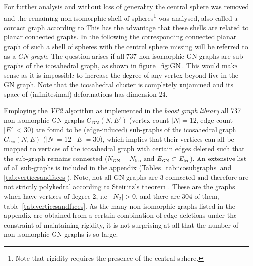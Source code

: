 For further analysis and without loss of generality the central sphere was
removed and the remaining non-isomorphic shell of spheres\footnote{Note that
rigidity requires the presence of the central sphere.} was analysed, also called
a contact graph according to
\citeauthor{Schuette_AufwelcherKugel_1951}\autocite{Schuette_AufwelcherKugel_1951}
This has the advantage that these shells are related to planar connected graphs.
In the following the corresponding connected planar graph of such a shell of
spheres with the central sphere missing will be referred to as a \textit{GN
graph}. The question arises if all 737 non-isomorphic GN graphs are sub-graphs
of the icosahedral graph, as shown in figure~\ref{fig:GN}. This would make sense
as it is impossible to increase the degree of any vertex beyond five in
the \ac{GN} graph. Note that the icosahedral cluster is completely unjammed and
its space of (infinitesimal) deformations has dimension
24.\autocite{Kusner_ConfigurationSpacesEqual_2018}

Employing the \textit{VF2} algorithm
\autocite{Cordella_SubGraphIsomorphism_2004} as implemented in the \textit{boost
graph library} \autocite{Siek_BoostGraphLibrary_2002} all 737 non-isomorphic
\ac{GN} graphs $G_\mathrm{GN}(N,E')$ (vertex count $|N|=12$, edge count
$|E'|<30$) are found to be (edge-induced) sub-graphs of the icosahedral graph
$G_\mathrm{ico}(N,E)$ ($|N|=12$, $|E|=30$), which implies that their vertices
can all be mapped to vertices of the icosahedral graph with certain edges
deleted such that the sub-graph remains connected ($N_\mathrm{GN} =
N_\mathrm{ico}$ and $E_\mathrm{GN}\subset E_\mathrm{ico}$). An extensive list of
all sub-graphs is included in the appendix (Tables~\ref{tab:icosubgraphs} and
\ref{tab:verticesandfaces}). Note, not all GN graphs are 3-connected and
therefore are not strictly polyhedral according to Steinitz's theorem
\autocite{Steinitz_PolyederundRaumeinteilungen_1916}. These are the graphs which
have vertices of degree 2, i.e. $|N_2|>0$, and there are 304 of them,
table~\ref{tab:verticesandfaces}. As the many non-isomorphic graphs listed in
the appendix are obtained from a certain combination of edge deletions under the
constraint of maintaining rigidity, it is not surprising at all that the number
of non-isomorphic \ac{GN} graphs is so large.

